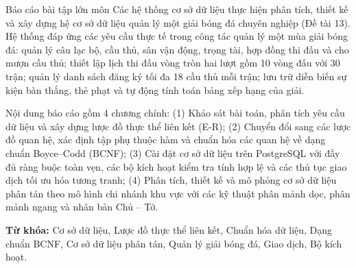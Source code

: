 \thispagestyle{plain}


Báo cáo bài tập lớn môn Các hệ thống cơ sở dữ liệu thực hiện phân tích, thiết kế và xây dựng hệ cơ sở dữ liệu quản lý một giải bóng đá chuyên nghiệp (Đề tài 13). Hệ thống đáp ứng các yêu cầu thực tế trong công tác quản lý một mùa giải bóng đá: quản lý câu lạc bộ, cầu thủ, sân vận động, trọng tài, hợp đồng thi đấu và cho mượn cầu thủ; thiết lập lịch thi đấu vòng tròn hai lượt gồm 10 vòng đấu với 30 trận; quản lý danh sách đăng ký tối đa 18 cầu thủ mỗi trận; lưu trữ diễn biến sự kiện bàn thắng, thẻ phạt và tự động tính toán bảng xếp hạng của giải.

Nội dung báo cáo gồm 4 chương chính: (1) Khảo sát bài toán, phân tích yêu cầu dữ liệu và xây dựng lược đồ thực thể liên kết (E-R); (2) Chuyển đổi sang các lược đồ quan hệ, xác định tập phụ thuộc hàm và chuẩn hóa các quan hệ về dạng chuẩn Boyce--Codd (BCNF); (3) Cài đặt cơ sở dữ liệu trên PostgreSQL với đầy đủ ràng buộc toàn vẹn, các bộ kích hoạt kiểm tra tính hợp lệ và các thủ tục giao dịch tối ưu hóa tương tranh; (4) Phân tích, thiết kế và mô phỏng cơ sở dữ liệu phân tán theo mô hình chi nhánh khu vực với các kỹ thuật phân mảnh dọc, phân mảnh ngang và nhân bản Chủ -- Tớ.

\vspace{1cm}

\noindent\textbf{Từ khóa:} Cơ sở dữ liệu, Lược đồ thực thể liên kết, Chuẩn hóa dữ liệu, Dạng chuẩn BCNF, Cơ sở dữ liệu phân tán, Quản lý giải bóng đá, Giao dịch, Bộ kích hoạt.
